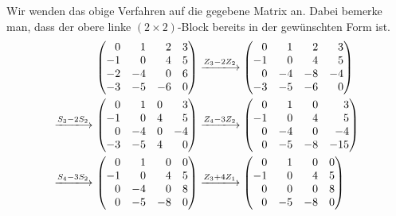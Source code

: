 Wir wenden das obige Verfahren auf die gegebene Matrix an.
Dabei bemerke man, dass der obere linke $(2 \times 2)$-Block bereits in der gewünschten Form ist.
\begingroup
\allowdisplaybreaks
\begin{align*}
  &\,
  \begin{pmatrix*}[r]
     0  &  1  &  2  & 3 \\
    -1  &  0  &  4  & 5 \\
    -2  & -4  &  0  & 6 \\
    -3  & -5  & -6  & 0
  \end{pmatrix*}
  \xlongrightarrow{Z_3 - 2 Z_2}
  \begin{pmatrix*}[r]
     0  &  1  &  2  &  3  \\
    -1  &  0  &  4  &  5  \\
     0  & -4  & -8  & -4  \\
    -3  & -5  & -6  &  0
  \end{pmatrix*}
  \\
  \xlongrightarrow{S_3 - 2 S_2}&\,
  \begin{pmatrix*}[r]
     0  &  1  &  0  &  3  \\
    -1  &  0  &  4  &  5  \\
     0  & -4  &  0  & -4  \\
    -3  & -5  &  4  &  0
  \end{pmatrix*}
  \xlongrightarrow{Z_4 - 3 Z_2}
  \begin{pmatrix*}[r]
     0  &  1  &  0  &   3 \\
    -1  &  0  &  4  &   5 \\
     0  & -4  &  0  &  -4 \\
     0  & -5  & -8  & -15
  \end{pmatrix*}
  \\
  \xlongrightarrow{S_4 - 3 S_2}&\,
  \begin{pmatrix*}[r]
     0  &  1  &  0  & 0 \\
    -1  &  0  &  4  & 5 \\
     0  & -4  &  0  & 8 \\
     0  & -5  & -8  & 0
  \end{pmatrix*}
  \xlongrightarrow{Z_3 + 4 Z_1}
  \begin{pmatrix*}[r]
     0  &  1  &  0  & 0 \\
    -1  &  0  &  4  & 5 \\
     0  &  0  &  0  & 8 \\
     0  & -5  & -8  & 0
  \end{pmatrix*}
  \\

\end{align*}
